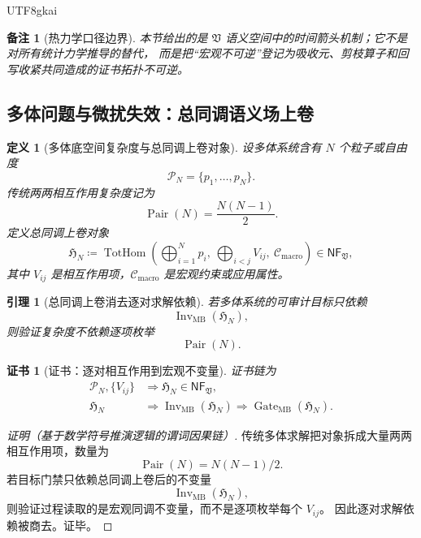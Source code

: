\documentclass[12pt]{article}
\newtheorem{definition}{定义}[section]
\newtheorem{lemma}{引理}[section]
\newtheorem{remark}{备注}[section]
\newtheorem{Certificate}{证书}[section]
\newcommand{\Vsys}{\mathfrak V}
\newcommand{\NF}{\mathsf{NF}}
\newcommand{\DefEq}{\coloneqq}
\DeclareMathOperator{\Gate}{Gate}
\DeclareMathOperator{\Inv}{Inv}
\DeclareMathOperator{\TotHom}{TotHom}
\DeclareMathOperator{\Pair}{Pair}
\begin{document}
\begin{CJK*}{UTF8}{gkai}
\begin{remark}[热力学口径边界]
本节给出的是 \(\Vsys\) 语义空间中的时间箭头机制；它不是对所有统计力学推导的替代，
而是把“宏观不可逆”登记为吸收元、剪枝算子和回写收紧共同造成的证书拓扑不可逆。
\end{remark}

\subsection{多体问题与微扰失效：总同调语义场上卷}
\label{subsec:tex59-manybody-totalhom}

\begin{definition}[多体底空间复杂度与总同调上卷对象]
\label{def:tex59-manybody-unroll}
设多体系统含有 \(N\) 个粒子或自由度
\[
  \mathcal P_N=\{p_1,\ldots,p_N\}.
\]
传统两两相互作用复杂度记为
\[
  \Pair(N)=\frac{N(N-1)}{2}.
\]
定义总同调上卷对象
\[
  \mathfrak H_N
  \DefEq
  \TotHom\left(
  \bigoplus_{i=1}^{N}p_i,\ 
  \bigoplus_{i<j}V_{ij},\
  \mathcal C_{\mathrm{macro}}
  \right)
  \in\NF_{\Vsys},
\]
其中 \(V_{ij}\) 是相互作用项，\(\mathcal C_{\mathrm{macro}}\) 是宏观约束或应用属性。
\end{definition}

\begin{lemma}[总同调上卷消去逐对求解依赖]
\label{lem:tex59-manybody-pair-quotient}
若多体系统的可审计目标只依赖
\[
  \Inv_{\mathrm{MB}}(\mathfrak H_N),
\]
则验证复杂度不依赖逐项枚举
\[
  \Pair(N).
\]
\end{lemma}

\begin{Certificate}[证书：逐对相互作用到宏观不变量]
\label{cert:tex59-manybody-pair-quotient}
证书链为
\[
  \begin{aligned}
  \mathcal P_N,\{V_{ij}\}
  &\Longrightarrow
  \mathfrak H_N\in\NF_{\Vsys},\\
  \mathfrak H_N
  &\Longrightarrow
  \Inv_{\mathrm{MB}}(\mathfrak H_N)
  \Longrightarrow
  \Gate_{\mathrm{MB}}(\mathfrak H_N).
  \end{aligned}
\]
\end{Certificate}

\begin{proof}[证明（基于数学符号推演逻辑的谓词因果链）]
传统多体求解把对象拆成大量两两相互作用项，数量为
\[
  \Pair(N)=N(N-1)/2.
\]
若目标门禁只依赖总同调上卷后的不变量
\[
  \Inv_{\mathrm{MB}}(\mathfrak H_N),
\]
则验证过程读取的是宏观同调不变量，而不是逐项枚举每个 \(V_{ij}\)。
因此逐对求解依赖被商去。证毕。
\end{proof}


\end{CJK*}
\end{document}
